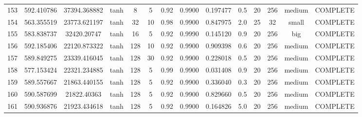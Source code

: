 \begin{longtable}{cccccccccccccc}
                      153 &                 592.410786 &                       37394.368882 &            tanh &           8 &              5 &        0.92 & 0.9900 &       0.197477 &             0.5 &                 20 &      256 &    medium & COMPLETE \\
                      154 &                 563.355519 &                       23773.621197 &            tanh &          32 &             10 &        0.98 & 0.9900 &       0.847975 &             2.0 &                 25 &       32 &     small & COMPLETE \\
                      155 &                 583.838737 &                        32420.20747 &            tanh &          16 &              5 &        0.92 & 0.9990 &       0.145120 &             0.9 &                 20 &      256 &       big & COMPLETE \\
                      156 &                 592.185406 &                       22120.873322 &            tanh &         128 &             10 &        0.92 & 0.9900 &       0.909398 &             0.6 &                 20 &      256 &    medium & COMPLETE \\
                      157 &                 589.849275 &                       23339.416045 &            tanh &         128 &             30 &        0.92 & 0.9900 &       0.228018 &             0.5 &                 20 &      256 &    medium & COMPLETE \\
                      158 &                 577.153424 &                       22321.234885 &            tanh &         128 &              5 &        0.99 & 0.9900 &       0.031408 &             0.9 &                 20 &      256 &    medium & COMPLETE \\
                      159 &                 589.557667 &                       21863.440155 &            tanh &         128 &              5 &        0.92 & 0.9900 &       0.336040 &             0.3 &                 20 &      256 &    medium & COMPLETE \\
                      160 &                 590.587699 &                        21822.40363 &            tanh &         128 &              5 &        0.92 & 0.9900 &       0.829660 &             0.5 &                 20 &      256 &    medium & COMPLETE \\
                      161 &                 590.936876 &                       21923.434618 &            tanh &         128 &              5 &        0.92 & 0.9900 &       0.164826 &             5.0 &                 20 &      256 &    medium & COMPLETE \\
\end{longtable}

